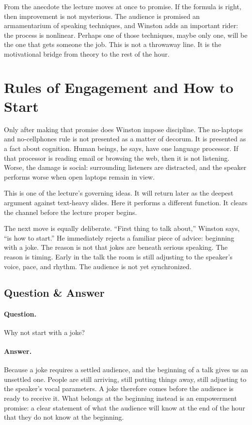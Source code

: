 From the anecdote the lecture moves at once to promise. If the formula is right, then improvement is not mysterious. The audience is promised an armamentarium of speaking techniques, and Winston adds an important rider: the process is nonlinear. Perhaps one of those techniques, maybe only one, will be the one that gets someone the job. This is not a throwaway line. It is the motivational bridge from theory to the rest of the hour.

\section{Rules of Engagement and How to Start}

Only after making that promise does Winston impose discipline. The no-laptops and no-cellphones rule is not presented as a matter of decorum. It is presented as a fact about cognition. Human beings, he says, have one language processor. If that processor is reading email or browsing the web, then it is not listening. Worse, the damage is social: surrounding listeners are distracted, and the speaker performs worse when open laptops remain in view.

This is one of the lecture's governing ideas. It will return later as the deepest argument against text-heavy slides. Here it performs a different function. It clears the channel before the lecture proper begins.

The next move is equally deliberate. ``First thing to talk about,'' Winston says, ``is how to start.'' He immediately rejects a familiar piece of advice: beginning with a joke. The reason is not that jokes are beneath serious speaking. The reason is timing. Early in the talk the room is still adjusting to the speaker's voice, pace, and rhythm. The audience is not yet synchronized.

\subsection{Question \& Answer}

\paragraph{Question.} Why not start with a joke?

\paragraph{Answer.} Because a joke requires a settled audience, and the beginning of a talk gives us an unsettled one. People are still arriving, still putting things away, still adjusting to the speaker's vocal parameters. A joke therefore comes before the audience is ready to receive it. What belongs at the beginning instead is an empowerment promise: a clear statement of what the audience will know at the end of the hour that they do not know at the beginning.

